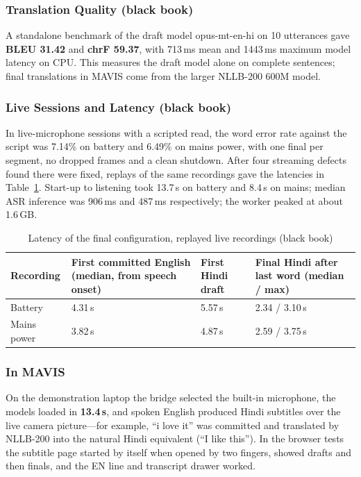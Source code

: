 \documentclass[12pt,singleside,a4paper]{article}
\begin{document}
\subsubsection{Translation Quality (black book)}
A standalone benchmark of the draft model opus-mt-en-hi on 10 utterances gave \textbf{BLEU 31.42} and \textbf{chrF 59.37}, with 713\,ms mean and 1443\,ms maximum model latency on CPU. This measures the draft model alone on complete sentences; final translations in MAVIS come from the larger NLLB-200 600M model.

\subsubsection{Live Sessions and Latency (black book)}
In live-microphone sessions with a scripted read, the word error rate against the script was 7.14\% on battery and 6.49\% on mains power, with one final per segment, no dropped frames and a clean shutdown. After four streaming defects found there were fixed, replays of the same recordings gave the latencies in Table~\ref{tab:trlat}. Start-up to listening took 13.7\,s on battery and 8.4\,s on mains; median ASR inference was 906\,ms and 487\,ms respectively; the worker peaked at about 1.6\,GB.

\begin{table}[H]
\centering
\caption{Latency of the final configuration, replayed live recordings (black book)}
\label{tab:trlat}
\small
\begin{tabularx}{\textwidth}{@{}p{2.8cm}XXX@{}}
\toprule
\textbf{Recording} & \textbf{First committed English (median, from speech onset)} & \textbf{First Hindi draft} & \textbf{Final Hindi after last word (median / max)} \\
\midrule
Battery & 4.31\,s & 5.57\,s & 2.34 / 3.10\,s \\
Mains power & 3.82\,s & 4.87\,s & 2.59 / 3.75\,s \\
\bottomrule
\end{tabularx}
\end{table}

\subsubsection{In MAVIS}
On the demonstration laptop the bridge selected the built-in microphone, the models loaded in \textbf{13.4\,s}, and spoken English produced Hindi subtitles over the live camera picture---for example, ``i love it'' was committed and translated by NLLB-200 into the natural Hindi equivalent (``I like this''). In the browser tests the subtitle page started by itself when opened by two fingers, showed drafts and then finals, and the EN line and transcript drawer worked.
\end{document}
